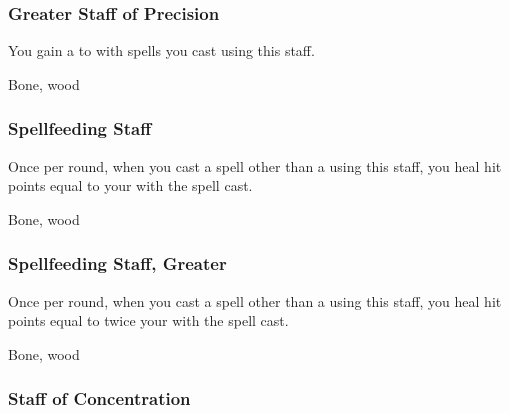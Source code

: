 
\lowercase{\hypertarget{item:Greater Staff of Precision}{}}\label{item:Greater Staff of Precision}
\hypertarget{item:Greater Staff of Precision}{\subsubsection{Greater Staff of Precision\hfill{}}}

You gain a   to  with spells you cast using this staff.



 


 Bone, wood


\lowercase{\hypertarget{item:Spellfeeding Staff}{}}\label{item:Spellfeeding Staff}
\hypertarget{item:Spellfeeding Staff}{\subsubsection{Spellfeeding Staff\hfill{}}}

Once per round, when you cast a spell other than a  using this staff,
you heal hit points equal to your  with the spell cast.



 


 Bone, wood


\lowercase{\hypertarget{item:Spellfeeding Staff, Greater}{}}\label{item:Spellfeeding Staff, Greater}
\hypertarget{item:Spellfeeding Staff, Greater}{\subsubsection{Spellfeeding Staff, Greater\hfill{}}}

Once per round, when you cast a spell other than a  using this staff,
you heal hit points equal to twice your  with the spell cast.



 


 Bone, wood


\lowercase{\hypertarget{item:Staff of Concentration}{}}\label{item:Staff of Concentration}
\hypertarget{item:Staff of Concentration}{\subsubsection{Staff of Concentration\hfill{}}}

